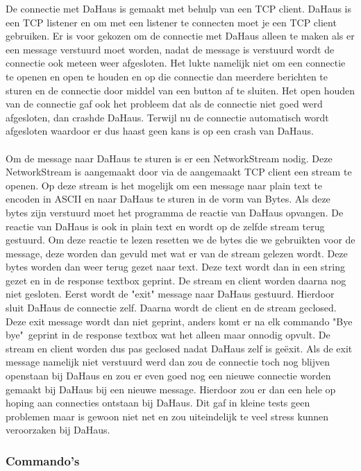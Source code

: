 \documentclass[11pt]{article}
\begin{document}
	De connectie met DaHaus is gemaakt met behulp van een TCP client. DaHaus is een TCP listener en om met een listener te connecten moet je een TCP client gebruiken. Er is voor gekozen om de connectie met DaHaus alleen te maken als er een message verstuurd moet worden, nadat de message is verstuurd wordt de connectie ook meteen weer afgesloten. Het lukte namelijk niet om een connectie te openen en open te houden en op die connectie dan meerdere berichten te sturen en de connectie door middel van een button af te sluiten. Het open houden van de connectie gaf ook het probleem dat als de connectie niet goed werd afgesloten, dan crashde DaHaus. Terwijl nu de connectie automatisch wordt afgesloten waardoor er dus haast geen kans is op een crash van DaHaus.
	\\
	\\
	Om de message naar DaHaus te sturen is er een NetworkStream nodig.
	Deze NetworkStream is aangemaakt door via de aangemaakt TCP client een stream te openen. Op deze stream is het mogelijk om een message naar plain text te encoden in ASCII en naar DaHaus te sturen in de vorm van Bytes. Als deze bytes zijn verstuurd moet het programma de reactie van DaHaus opvangen. De reactie van DaHaus is ook in plain text en wordt op de zelfde stream terug gestuurd. Om deze reactie te lezen resetten we de bytes die we gebruikten voor de message, deze worden dan gevuld met wat er van de stream gelezen wordt. Deze bytes worden dan weer terug gezet naar text. Deze text wordt dan in een string gezet en in de response textbox geprint. De stream en client worden daarna nog niet gesloten. Eerst wordt de "exit" message naar DaHaus gestuurd. Hierdoor sluit DaHaus de connectie zelf. Daarna wordt de client en de stream geclosed. Deze exit message wordt dan niet geprint, anders komt er na elk commando "Bye bye"\  geprint in de response textbox wat het alleen maar onnodig opvult. De stream en client worden dus pas geclosed nadat DaHaus zelf is ge\"{e}xit. Als de exit message namelijk niet verstuurd werd dan zou de connectie toch nog blijven openstaan bij DaHaus en zou er even goed nog een nieuwe connectie worden gemaakt bij DaHaus bij een nieuwe message. Hierdoor zou er dan een hele op hoping aan connecties ontstaan bij DaHaus. Dit gaf in kleine tests geen problemen maar is gewoon niet net en zou uiteindelijk te veel stress kunnen veroorzaken bij DaHaus. 
	\subsubsection{Commando's}
	
\end{document}
